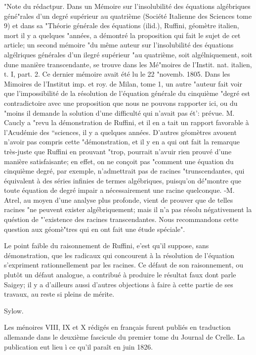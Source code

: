 \documentclass{article}
\begin{document}
"Note du rédactpur. Dans un Mémoire sur l'insolubilité des équations algébriques géné"rales d'un degré supérieur au quatrième (Société Italienne des Sciences tome 9) et dans sa "Théorie générale des équations (ilid.), Ruffini, géomètre italien, mort il y a quelques "années, a démontré la proposition qui fait le sujet de cet article; un second mémoire "du même auteur sur l'insolubilité des équations algélriques générales d'un ilegré supérieur "au quatrième, soit algélniquement, soit dune manière transcendante, se trouve dans les Mé"moires de l'Instit. nat. italien, t. I, part. 2. Ce dernier mémoire avait été lu le 22 "novemb. 1805. Dans les Mimoires de l'Institut imp. et roy. de Milan, tome 1, un autre "auteur fait voir que l'impossibilité de la résolution de l'équation générale du cinquième "degré est contradictoire avec une proposition que nous ne pouvons rapporter ici, ou du "moins il demande la solution d'une difficulté qui n'avait pas ét': prévue. M. Caucly a "revu la démonstration de Ruffini, et il en a tait un rapport favorable à l'Acudémie des “sciences, il y a quelques années. D'autres géomètres avouent n'avoir pas compris cette "démonstration, et il y en a qui ont fait la remarque très-juste que Ruffini en prouvant "trop, pourrait n'avuir rien prouvé d'une manière satisfaisante; en effet, on ne conçoit pas "comment une équation du cinquième degré, par exemple, n'admettrait pas de racines "trunscendantes, qui équivalent à des séries infinies de termes algébriques, puisqu'on dé"montre que toute équation de degré impair a nécessairement une racine quelconque. -M. Atrel, au moyen d'une analyse plus profonde, vient de prouver que de telles racines "ne peuvent exister algébriquement; mais il n'a pas résolu négativement la quéstion de "'existence des racines transcendantes. Nous recommandons cette question aux géomè"tres qui en ont fait une étude spéciale".

Le point faible du raisonnement de Ruffini, e'est qu'il suppose, sans démonstration, que les radicaux qui concourent à la résolution de l'équation s'expriment rationnellement par les racines. Ce défaut de son raisonnement, ou plutôt un défaut analogue, a contribué à produire le résultat faux dont parle Saigey; il y a d'ailleurs aussi d'autres objections à faire à cette partie de ses travaux, au reste si pleins de mérite.

Sylow.

Les ménoires VIII, IX et \(\mathrm{X}\) rédigés en français furent publiés en traduction allemande dans le deuxième fascicule du premier tome du Journal de Crelle. La publication eut lieu ì ce qu'il paraît en juin 1826.
\end{document}
